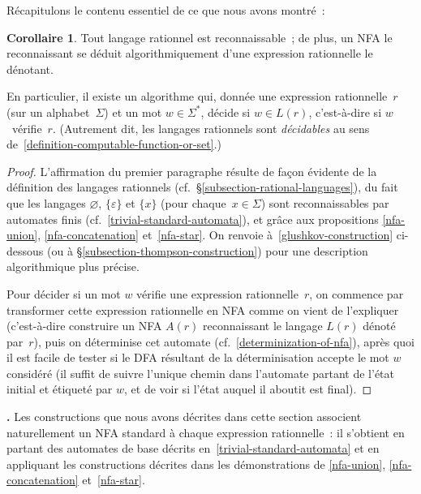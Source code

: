 \documentclass[12pt,a4paper]{article}
\theoremstyle{definition}
\newcommand\thingy{%
\refstepcounter{comcnt}\medskip\noindent\textbf{\thecomcnt.} }
\newtheorem{cor}[comcnt]{Corollaire}
\begin{document}
\bigbreak

Récapitulons le contenu essentiel de ce que nous avons montré :

\begin{cor}\label{rational-languages-are-recognizable}
Tout langage rationnel est reconnaissable ; de plus, un NFA le
reconnaissant se déduit algorithmiquement d'une expression rationnelle
le dénotant.

En particulier, il existe un algorithme qui, donnée une expression
rationnelle $r$ (sur un alphabet $\Sigma$) et un mot $w \in \Sigma^*$,
décide si $w\in L(r)$, c'est-à-dire si $w$ vérifie $r$.  (Autrement
dit, les langages rationnels sont \emph{décidables} au sens
de \ref{definition-computable-function-or-set}.)
\end{cor}
\begin{proof}
L'affirmation du premier paragraphe résulte de façon évidente de la
définition des langages rationnels
(cf. §\ref{subsection-rational-languages}), du fait que les langages
$\varnothing$, $\{\varepsilon\}$ et $\{x\}$ (pour chaque $x\in\Sigma$)
sont reconnaissables par automates finis
(cf. \ref{trivial-standard-automata}), et grâce aux propositions
\ref{nfa-union}, \ref{nfa-concatenation} et \ref{nfa-star}.  On
renvoie à \ref{glushkov-construction} ci-dessous (ou à
§\ref{subsection-thompson-construction}) pour une description
algorithmique plus précise.

Pour décider si un mot $w$ vérifie une expression rationnelle $r$, on
commence par transformer cette expression rationnelle en NFA comme on
vient de l'expliquer (c'est-à-dire construire un NFA $A(r)$
reconnaissant le langage $L(r)$ dénoté par $r$), puis on déterminise
cet automate (cf. \ref{determinization-of-nfa}), après quoi il est
facile de tester si le DFA résultant de la déterminisation accepte le
mot $w$ considéré (il suffit de suivre l'unique chemin dans l'automate
partant de l'état initial et étiqueté par $w$, et de voir si l'état
auquel il aboutit est final).
\end{proof}

\thingy\label{glushkov-construction} Les constructions que nous avons
décrites dans cette section associent naturellement un NFA standard à
chaque expression rationnelle : il s'obtient en partant des automates
de base décrits en \ref{trivial-standard-automata} et en appliquant
les constructions décrites dans les démonstrations de \ref{nfa-union},
\ref{nfa-concatenation} et \ref{nfa-star}.

\medskip
\end{document}

